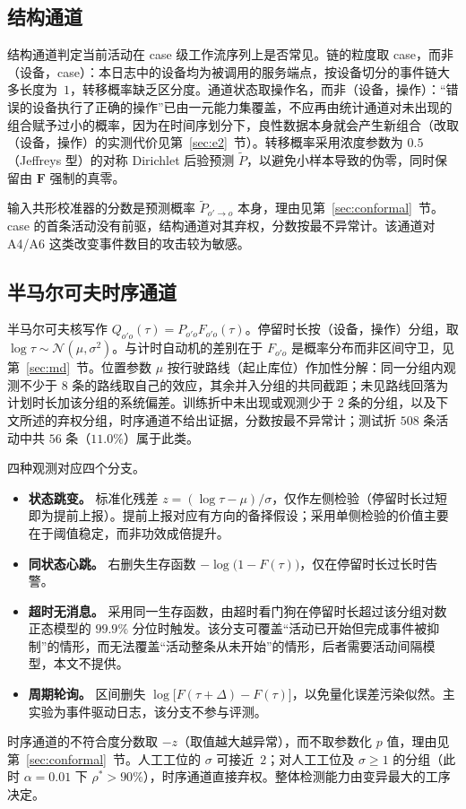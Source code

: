 \documentclass[manuscript,screen,review]{acmart}
\begin{document}
\subsection{结构通道}
\label{sec:struct}

结构通道判定当前活动在 case 级工作流序列上是否常见。链的粒度取 case，而非（设备，case）：本日志中的设备均为被调用的服务端点，按设备切分的事件链大多长度为~$1$，转移概率缺乏区分度。通道状态取操作名，而非（设备，操作）：``错误的设备执行了正确的操作''已由一元能力集覆盖，不应再由统计通道对未出现的组合赋予过小的概率，因为在时间序划分下，良性数据本身就会产生新组合（改取（设备，操作）的实测代价见第~\ref{sec:e2}~节）。转移概率采用浓度参数为 $0.5$（{Jeffreys} 型）的对称 {Dirichlet} 后验预测 $\tilde P$，以避免小样本导致的伪零，同时保留由 $\mathbf F$ 强制的真零。

输入共形校准器的分数是预测概率 $\tilde P_{o'\to o}$ 本身，理由见第~\ref{sec:conformal}~节。case 的首条活动没有前驱，结构通道对其弃权，分数按最不异常计。该通道对 {A4}/{A6} 这类改变事件数目的攻击较为敏感。

\subsection{半马尔可夫时序通道}
\label{sec:timing}

半马尔可夫核写作 $Q_{o'o}(\tau)=P_{o'o}F_{o'o}(\tau)$。停留时长按（设备，操作）分组，取 $\log\tau\sim\mathcal{N}(\mu,\sigma^2)$。与计时自动机的差别在于 $F_{o'o}$ 是概率分布而非区间守卫，见第~\ref{sec:md}~节。位置参数 $\mu$ 按行驶路线（起止库位）作加性分解：同一分组内观测不少于 $8$ 条的路线取自己的效应，其余并入分组的共同截距；未见路线回落为计划时长加该分组的系统偏差。训练折中未出现或观测少于 $2$ 条的分组，以及下文所述的弃权分组，时序通道不给出证据，分数按最不异常计；测试折 $508$ 条活动中共 $56$ 条（$11.0\%$）属于此类。

四种观测对应四个分支。
\begin{itemize}[leftmargin=1.4em,itemsep=2pt]
\item \textbf{状态跳变。} 标准化残差 $z=(\log\tau-\mu)/\sigma$，仅作左侧检验（停留时长过短即为提前上报）。提前上报对应有方向的备择假设；采用单侧检验的价值主要在于阈值稳定，而非功效成倍提升。
\item \textbf{同状态心跳。} 右删失生存函数 $-\log\bigl(1-F(\tau)\bigr)$，仅在停留时长过长时告警。
\item \textbf{超时无消息。} 采用同一生存函数，由超时看门狗在停留时长超过该分组对数正态模型的 $99.9\%$ 分位时触发。该分支可覆盖``活动已开始但完成事件被抑制''的情形，而无法覆盖``活动整条从未开始''的情形，后者需要活动间隔模型，本文不提供。
\item \textbf{周期轮询。} 区间删失 $\log\bigl[F(\tau+\Delta)-F(\tau)\bigr]$，以免量化误差污染似然。主实验为事件驱动日志，该分支不参与评测。
\end{itemize}
时序通道的不符合度分数取 $-z$（取值越大越异常），而不取参数化 $p$ 值，理由见第~\ref{sec:conformal}~节。人工工位的 $\sigma$ 可接近~$2$；对人工工位及 $\sigma\ge1$ 的分组（此时 $\alpha=0.01$ 下 $\rho^*>90\%$），时序通道直接弃权。整体检测能力由变异最大的工序决定。
\end{document}
